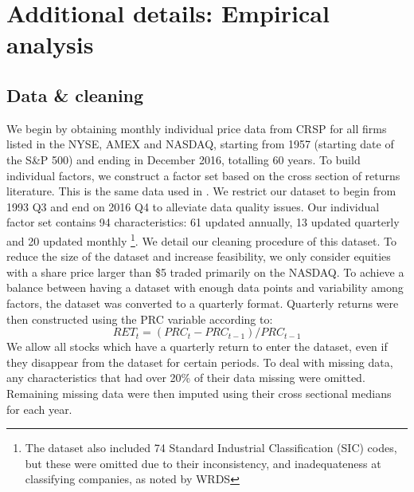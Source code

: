 \documentclass{article}
\begin{document}
\newpage

\section{Additional details: Empirical analysis}

\subsection{Data \& cleaning}\label{app:clean}
We begin by obtaining monthly individual price data from CRSP for all firms listed in the NYSE, AMEX and NASDAQ, starting from 1957 (starting date of the S\&P 500) and ending in December 2016, totalling 60 years. To build individual factors, we construct a factor set based on the cross section of returns literature. This is the same data used in \cite{gu_empirical_2019}. We restrict our dataset to begin from 1993 Q3 and end on 2016 Q4 to alleviate data quality issues. Our individual factor set contains 94 characteristics: 61 updated annually, 13 updated quarterly and 20 updated monthly \footnote{The dataset also included 74 Standard Industrial Classification (SIC) codes, but these were omitted due to their inconsistency, and inadequateness at classifying companies, as noted by WRDS}.
We detail our cleaning procedure of this dataset. To reduce the size of the dataset and increase feasibility, we only consider equities with a share price larger than \$5 traded primarily on the NASDAQ. To achieve a balance between having a dataset with enough data points and variability among factors, the dataset was converted to a quarterly format. Quarterly returns were then constructed using the PRC variable according to:
\begin{equation}
RET_t = (PRC_t - PRC_{t-1})/PRC_{t-1}
\end{equation}
We allow all stocks which have a quarterly return to enter the dataset, even if they disappear from the dataset for certain periods. To deal with missing data, any characteristics that had over 20\% of their data missing were omitted. Remaining missing data were then imputed using their cross sectional medians for each year. 
\end{document}
